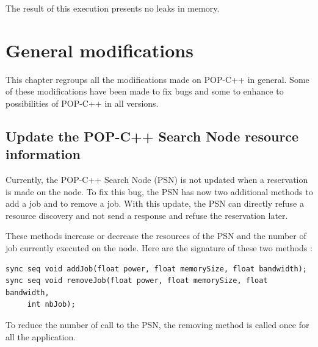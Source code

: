 The result of this execution presents no leaks in memory. 
\s

%
%
\pagebreak
\section{General modifications}
\label{sec:gen_mod}
This chapter regroups all the modifications made on POP-C++ in general. Some of these modifications have been made to fix bugs and some to enhance to possibilities of POP-C++ in all versions. 

\subsection{Update the POP-C++ Search Node resource information}
Currently, the POP-C++ Search Node (PSN) is not updated when a reservation is made on the node. To fix this bug, the PSN has now two additional methods to add a job and to remove a job. With this update, the PSN can directly refuse a resource discovery and not send a response and refuse the reservation later.\s

These methods increase or decrease the resources of the PSN and the number of job currently executed on the node. Here are the signature of these two methods : \s
\begin{lstlisting}
sync seq void addJob(float power, float memorySize, float bandwidth);
sync seq void removeJob(float power, float memorySize, float bandwidth, 
     int nbJob);
\end{lstlisting}

To reduce the number of call to the PSN, the removing method is called once for all the application. 
